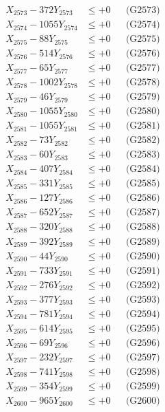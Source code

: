 \documentclass[a4paper,10pt]{article}
\begin{document}
{\begin{align}
X_{2573} - 372Y_{2573} &\leq +0 && \text{(G2573)} \\
X_{2574} - 1055Y_{2574} &\leq +0 && \text{(G2574)} \\
X_{2575} - 88Y_{2575} &\leq +0 && \text{(G2575)} \\
X_{2576} - 514Y_{2576} &\leq +0 && \text{(G2576)} \\
X_{2577} - 65Y_{2577} &\leq +0 && \text{(G2577)} \\
X_{2578} - 1002Y_{2578} &\leq +0 && \text{(G2578)} \\
X_{2579} - 46Y_{2579} &\leq +0 && \text{(G2579)} \\
X_{2580} - 1055Y_{2580} &\leq +0 && \text{(G2580)} \\
\allowbreak
X_{2581} - 1055Y_{2581} &\leq +0 && \text{(G2581)} \\
X_{2582} - 73Y_{2582} &\leq +0 && \text{(G2582)} \\
X_{2583} - 60Y_{2583} &\leq +0 && \text{(G2583)} \\
X_{2584} - 407Y_{2584} &\leq +0 && \text{(G2584)} \\
X_{2585} - 331Y_{2585} &\leq +0 && \text{(G2585)} \\
X_{2586} - 127Y_{2586} &\leq +0 && \text{(G2586)} \\
X_{2587} - 652Y_{2587} &\leq +0 && \text{(G2587)} \\
X_{2588} - 320Y_{2588} &\leq +0 && \text{(G2588)} \\
X_{2589} - 392Y_{2589} &\leq +0 && \text{(G2589)} \\
X_{2590} - 44Y_{2590} &\leq +0 && \text{(G2590)} \\
\allowbreak
X_{2591} - 733Y_{2591} &\leq +0 && \text{(G2591)} \\
X_{2592} - 276Y_{2592} &\leq +0 && \text{(G2592)} \\
X_{2593} - 377Y_{2593} &\leq +0 && \text{(G2593)} \\
X_{2594} - 781Y_{2594} &\leq +0 && \text{(G2594)} \\
X_{2595} - 614Y_{2595} &\leq +0 && \text{(G2595)} \\
X_{2596} - 69Y_{2596} &\leq +0 && \text{(G2596)} \\
X_{2597} - 232Y_{2597} &\leq +0 && \text{(G2597)} \\
X_{2598} - 741Y_{2598} &\leq +0 && \text{(G2598)} \\
X_{2599} - 354Y_{2599} &\leq +0 && \text{(G2599)} \\
X_{2600} - 965Y_{2600} &\leq +0 && \text{(G2600)} \\

\end{align}}
\end{document}
